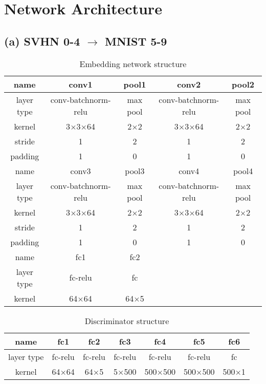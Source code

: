 \documentclass{article}
\begin{document}
\clearpage
{}


\clearpage
\section*{Network Architecture}
\subsection*{(a) SVHN 0-4 $\rightarrow$ MNIST 5-9}
\begin{table}[htbp]
\centering
\caption{Embedding network structure}
\begin{tabular}{|c|c|c|c|c|}
\hline
name & conv1 & pool1 & conv2 & pool2\\
\hline
\hline
layer type & conv-batchnorm-relu & max pool & conv-batchnorm-relu & max pool\\
kernel & 3$\times$3$\times$64 & 2$\times$2 & 3$\times$3$\times$64 & 2$\times$2\\
stride & 1 & 2 & 1 & 2\\
padding & 1 & 0 & 1 & 0\\
\hline
\hline
name & conv3 & pool3 & conv4 & pool4\\
\hline
\hline
layer type & conv-batchnorm-relu & max pool & conv-batchnorm-relu & max pool\\
kernel & 3$\times$3$\times$64 & 2$\times$2 & 3$\times$3$\times$64 & 2$\times$2\\
stride & 1 & 2 & 1 & 2\\
padding & 1 & 0 & 1 & 0\\
\hline
\hline
name & fc1 & fc2 & {} & {}\\
\hline
\hline
layer type & fc-relu & fc & {} & {}\\
kernel & 64$\times$64 & 64$\times$5 & {} & {}\\
\hline
\end{tabular}
\end{table}

\begin{table}[htbp]
\centering
\caption{Discriminator structure}
\begin{tabular}{|c|c|c|c|c|c|c|}
\hline
name & fc1 & fc2 & fc3 & fc4 & fc5 & fc6\\
\hline
\hline
layer type & fc-relu & fc-relu & fc-relu & fc-relu & fc-relu & fc\\
kernel & 64$\times$64 & 64$\times$5 & 5$\times$500 & 500$\times$500 & 500$\times$500 & 500$\times$1\\
\hline
\end{tabular}
\end{table}
\clearpage
\end{document}
